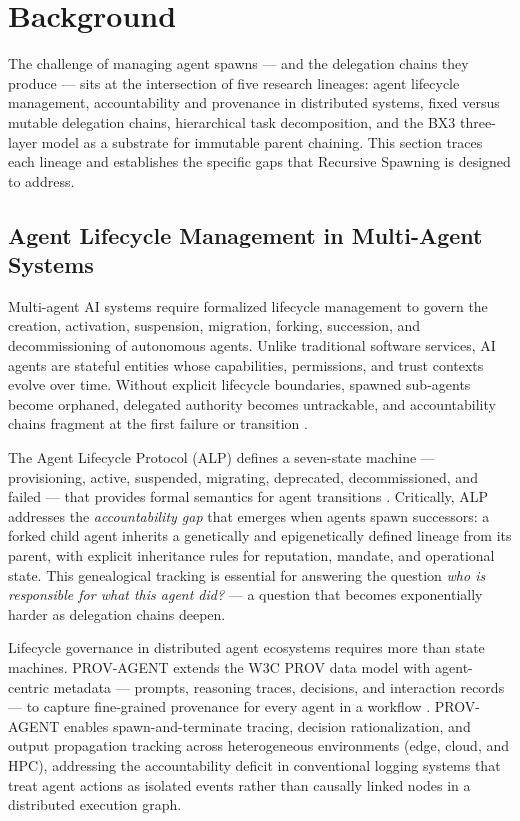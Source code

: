 \section{Background}
\label{sec:background}

The challenge of managing agent spawns — and the delegation chains they produce — sits at the intersection of five research lineages: agent lifecycle management, accountability and provenance in distributed systems, fixed versus mutable delegation chains, hierarchical task decomposition, and the BX3 three-layer model as a substrate for immutable parent chaining. This section traces each lineage and establishes the specific gaps that Recursive Spawning is designed to address.

\subsection{Agent Lifecycle Management in Multi-Agent Systems}
\label{sec:lifecycle-management}

Multi-agent AI systems require formalized lifecycle management to govern the creation, activation, suspension, migration, forking, succession, and decommissioning of autonomous agents. Unlike traditional software services, AI agents are stateful entities whose capabilities, permissions, and trust contexts evolve over time. Without explicit lifecycle boundaries, spawned sub-agents become orphaned, delegated authority becomes untrackable, and accountability chains fragment at the first failure or transition \cite{alp2026}.

The Agent Lifecycle Protocol (ALP) defines a seven-state machine — provisioning, active, suspended, migrating, deprecated, decommissioned, and failed — that provides formal semantics for agent transitions \cite{alp2026}. Critically, ALP addresses the \emph{accountability gap} that emerges when agents spawn successors: a forked child agent inherits a genetically and epigenetically defined lineage from its parent, with explicit inheritance rules for reputation, mandate, and operational state. This genealogical tracking is essential for answering the question \emph{who is responsible for what this agent did?} — a question that becomes exponentially harder as delegation chains deepen.

Lifecycle governance in distributed agent ecosystems requires more than state machines. PROV-AGENT extends the W3C PROV data model with agent-centric metadata — prompts, reasoning traces, decisions, and interaction records — to capture fine-grained provenance for every agent in a workflow \cite{provagent2025}. PROV-AGENT enables spawn-and-terminate tracing, decision rationalization, and output propagation tracking across heterogeneous environments (edge, cloud, and HPC), addressing the accountability deficit in conventional logging systems that treat agent actions as isolated events rather than causally linked nodes in a distributed execution graph.


